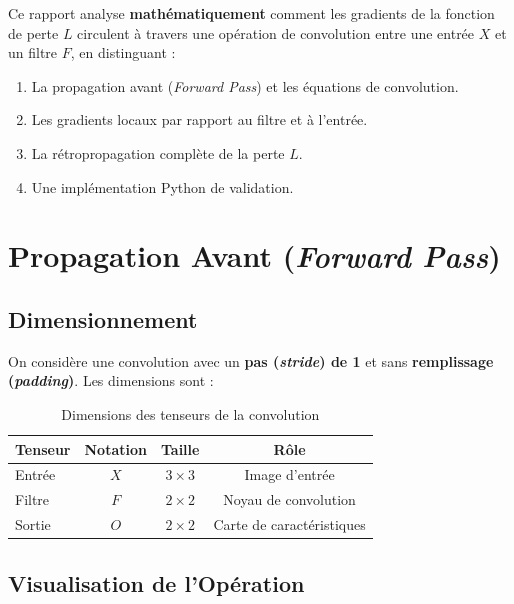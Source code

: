 \documentclass[12pt, a4paper]{article}
\begin{document}
Ce rapport analyse \textbf{mathématiquement} comment les gradients de la fonction
de perte $L$ circulent à travers une opération de convolution entre une entrée $X$
et un filtre $F$, en distinguant :
\begin{enumerate}[leftmargin=2cm, label=\textbf{\arabic{*}.}]
    \item La propagation avant (\textit{Forward Pass}) et les équations de convolution.
    \item Les gradients locaux par rapport au filtre et à l'entrée.
    \item La rétropropagation complète de la perte $L$.
    \item Une implémentation Python de validation.
\end{enumerate}

\section{Propagation Avant (\textit{Forward Pass})}

\subsection{Dimensionnement}

On considère une convolution avec un \textbf{pas (\textit{stride}) de 1} et sans
\textbf{remplissage (\textit{padding})}. Les dimensions sont :

\begin{table}[H]
    \centering
    \caption{Dimensions des tenseurs de la convolution}
    \label{tab:dims}
    \renewcommand{\arraystretch}{1.4}
    \begin{tabular}{lccc}
        \toprule
        \rowcolor{espblue!15}
        \textbf{Tenseur} & \textbf{Notation} & \textbf{Taille} & \textbf{Rôle} \\
        \midrule
        Entrée   & $X$ & $3 \times 3$ & Image d'entrée \\
        Filtre   & $F$ & $2 \times 2$ & Noyau de convolution \\
        Sortie   & $O$ & $2 \times 2$ & Carte de caractéristiques \\
        \bottomrule
    \end{tabular}
\end{table}

\subsection{Visualisation de l'Opération}
\end{document}

